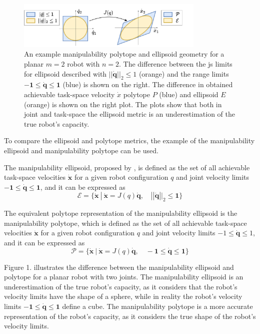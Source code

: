 \begin{figure}[!h]
    \centering
    \includegraphics[width=0.8\textwidth]{Chapters/imgs/ellip_poly.pdf}
    \caption{An example manipulability polytope and ellipsoid geometry for a planar $m=2$ robot with $n=2$. The difference between the \gls{js} limits for ellipsoid described with $||\dot{\bm{q}}||_2\leq1$ (orange) and the range limits $\bm{-1}\leq\dot{\bm{q}}\leq\bm{1}$ (blue) is shown on the right. The difference in obtained achievable task-space velocity $\dot{{x}}$ polytope ${P}$ (blue) and ellipsoid ${E}$ (orange) is shown on the right plot. The plots show that both in joint and task-space the ellipsoid metric is an underestimation of the true robot's capacity.}
    \label{fig:ellip_poly_dif_revisit}
\end{figure}

To compare the ellipsoid and polytope metrics, the example of the manipulability ellipsoid and manipulability polytope can be used. 

The manipulability ellipsoid, proposed by \citet{yoshikawa1985manipulability}, is defined as the set of all achievable task-space velocities ${\dot{\bm{x}}}$ for a given robot configuration ${q}$ and joint velocity limits $-\bm{1} \leq {\dot{\bm{q}}}\leq \bm{1}$, and it can be expressed as
\begin{equation}\label{eq:manip_ellipsoid}
\mathcal{E} = \{ \dot{\bm{x}} ~|~ \dot{\bm{x}} = J({q})\dot{\bm{q}}, \quad ||\dot{\bm{q}}||_2 \leq \bm{1} \}
\end{equation}

The equivalent polytope representation of the manipulability ellipsoid is the manipulability polytope, which is defined as the set of all achievable task-space velocities ${\dot{\bm{x}}}$ for a given robot configuration ${q}$ and joint velocity limits $-1 \leq {\dot{\bm{q}}}\leq 1$, and it can be expressed as
\begin{equation}\label{eq:manip_polytope}
\mathcal{P} = \{ \dot{\bm{x}} ~|~ \dot{\bm{x}} = J({q})\dot{\bm{q}}, \quad -\bm{1} \leq \dot{\bm{q}} \leq \bm{1} \}
\end{equation}

Figure 1. illustrates the difference between the manipulability ellipsoid and polytope for a planar robot with two joints. The manipulability ellipsoid is an underestimation of the true robot's capacity, as it considers that the robot's velocity limits have the shape of a sphere, while in reality the robot's velocity limits $-\bm{1} \leq {\dot{\bm{q}}}\leq \bm{1}$ define a cube. The manipulability polytope is a more accurate representation of the robot's capacity, as it considers the true shape of the robot's velocity limits. 

